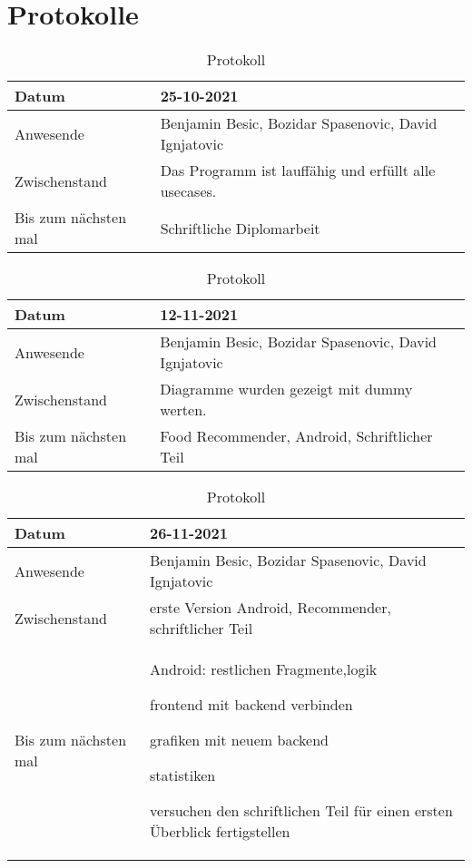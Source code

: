\section{Protokolle}
\begin{table}
    
    \begin{tabular}{|p{3cm}|p{10cm}|  }
        \hline
        Datum & 25-10-2021\\
        \hline
        Anwesende & Benjamin Besic, Bozidar Spasenovic, David Ignjatovic\\
        \hline
        Zwischenstand&  Das Programm ist lauffähig und erfüllt alle usecases. \\
        \hline
        Bis zum nächsten mal &  Schriftliche Diplomarbeit\\
        \hline
        
    \end{tabular}
    \caption{Protokoll}
    \label{tab:my_label}
\end{table}
\begin{table}
    \begin{tabular}{ |p{3cm}|p{10cm}|   }
        \hline
        Datum & 12-11-2021\\
        \hline
        Anwesende & Benjamin Besic, Bozidar Spasenovic, David Ignjatovic\\
        \hline
        Zwischenstand& Diagramme wurden gezeigt mit dummy werten.\\
        \hline
        Bis zum nächsten mal &  Food Recommender, Android, Schriftlicher Teil \\
        \hline
    \end{tabular}
    \caption{Protokoll}
    \label{tab:my_label}
\end{table}
\begin{table}
    \begin{tabular}{ |p{3cm}|p{10cm}|  }
        \hline
        Datum & 26-11-2021\\
        \hline
        Anwesende & Benjamin Besic, Bozidar Spasenovic, David Ignjatovic\\

        \hline
        Zwischenstand&  erste Version Android, Recommender, schriftlicher Teil
    
    \\
        \hline
        Bis zum nächsten mal &  

       Android: restlichen Fragmente,logik
        

    frontend mit backend verbinden

    grafiken mit neuem backend

    statistiken

    versuchen den schriftlichen Teil für einen ersten Überblick fertigstellen


    
    \\
        \hline
    \end{tabular}
    \caption{Protokoll}
    \label{tab:my_label}
\end{table}
